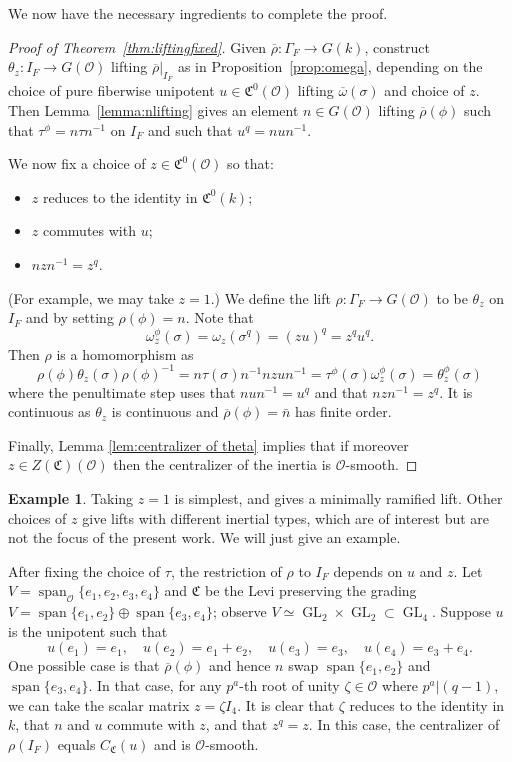 \documentclass[11pt, letterpaper,english]{amsart}
\theoremstyle{plain}
\theoremstyle{definition}
\newtheorem{example}[lem]{Example}
\numberwithin{equation}{section}
\numberwithin{lem}{section}
\newcommand{\fC}{\mathfrak{C}}
\newcommand{\cO}{\mathcal{O}}
\newcommand{\rhobar}{{\overline{\rho}}}
\newcommand{\omegabar}{{\overline{\omega}}}
\DeclareMathOperator{\GL}{GL}
\newcommand{\spn}{\operatorname{span}}
\begin{document}
We now have the necessary ingredients to complete the proof.

\begin{proof}[Proof of Theorem~\ref{thm:liftingfixed}]
Given $\rhobar : \Gamma_F \to G(k)$, 
construct $\theta_z : I_F \to G(\cO)$ lifting $\rhobar|_{I_F}$ as in Proposition~\ref{prop:omega}, depending on the choice of pure fiberwise unipotent $u \in \fC^0(\cO)$ lifting $\omegabar(\sigma)$ and choice of $z$.  
Then Lemma~\ref{lemma:nlifting} gives an element $n \in G(\cO)$ lifting $\rhobar(\phi)$ such that $\tau^{\phi} = n \tau n^{-1}$ on $I_F$ and such that $u^q = n u n^{-1}$.  

We now fix a choice of $z \in \fC^0(\cO)$ so that:
\begin{itemize}
    \item  $z$ reduces to the identity in $\fC^0(k)$;

    \item  $z$ commutes with $u$;
    
    \item  $n z n^{-1} = z^q$.
\end{itemize}
(For example, we may take $z=1$.)
We define the lift $\rho : \Gamma_F \to G(\cO)$ to be $\theta_z$ on $I_F$ and by setting $\rho(\phi) = n$.  Note that
\[
\omega_z^\phi(\sigma) = \omega_z(\sigma^q) = (z u)^ q = z^q u^q .
\]
Then $\rho$ is a homomorphism as
\[
\rho(\phi) \theta_z(\sigma) \rho(\phi)^{-1} = n \tau(\sigma) n^{-1} n z u n^{-1} = \tau^\phi(\sigma) \omega_z^\phi(\sigma) = \theta_z^{\phi}(\sigma)
\]
where the penultimate step uses that $n u n^{-1} = u^q$ and that $n z n^{-1} = z^q$.   
It is continuous as $\theta_z$ is continuous and $\overline{\rho}(\phi) = \bar{n}$ has finite order. 

Finally, Lemma \ref{lem:centralizer of theta} implies that if moreover $z \in Z(\fC)(\cO)$ then the centralizer of the inertia is $\cO$-smooth. 
\end{proof}

\begin{example} \label{ex:inertialtype}
Taking $z=1$ is simplest, and gives a minimally ramified lift.  Other choices of $z$ give lifts with different inertial types, which are of interest but are not the focus of the present work.  We will just give an example.

 After fixing the choice of $\tau$, the restriction of $\rho$ to $I_F$ depends on $u$ and $z$.  Let $V = \spn_{\cO}\{e_1,e_2,e_3,e_4\}$ and $\fC$ be the Levi preserving the grading $V= \spn \{e_1,e_2\} \oplus \spn \{e_3,e_4\}$; observe $V \simeq \GL_2 \times \GL_2 \subset \GL_4$.  Suppose $u$ is the unipotent such that
\[
u(e_1) = e_1, \quad  u(e_2) = e_1  +e_2, \quad u(e_3) = e_3, \quad u(e_4) = e_3 + e_4.
\]
One possible case is that $\rhobar(\phi)$ and hence $n$ swap $\spn \{e_1,e_2\}$ and $\spn \{e_3,e_4\}$.  In that case, for any $p^a$-th root of unity $\zeta \in \cO$ where $p^a | (q-1)$, we can take the scalar matrix $z = \zeta I_4$.
It is clear that $\zeta$ reduces to the identity in $k$, that $n$ and $u$ commute with $z$, and that $z^q = z$.  In this case, the centralizer of $\rho(I_F)$ equals $C_{\fC}(u)$ and is $\cO$-smooth.
\end{example}
\end{document}
